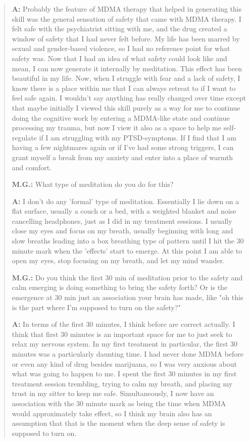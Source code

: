 \documentclass[12pt,letterpaper]{book}
\begin{document}
\begin{quotation}
    \textbf{A:} Probably the feature of MDMA therapy that helped in generating this skill was the general sensation of safety that came with MDMA therapy. I felt safe with the psychiatrist sitting with me, and the drug created a window of safety that I had never felt before. My life has been marred by sexual and gender-based violence, so I had no reference point for what safety was. Now that I had an idea of what safety could look like and mean, I can now generate it internally by meditation. This effect has been beautiful in my life. Now, when I struggle with fear and a lack of safety, I know there is a place within me that I can always retreat to if I want to feel safe again. I wouldn't say anything has really changed over time except that maybe initially I viewed this skill purely as a way for me to continue doing the cognitive work by entering a MDMA-like state and continue processing my trauma, but now I view it also as a space to help me self-regulate if I am struggling with my PTSD-symptoms. If I find that I am having a few nightmares again or if I've had some strong triggers, I can grant myself a break from my anxiety and enter into a place of warmth and comfort.

    \vspace{\baselineskip}

    \textbf{M.G.:} What type of meditation do you do for this?

    \textbf{A:} I don't do any 'formal' type of meditation. Essentially I lie down on a flat surface, usually a couch or a bed, with a weighted blanket and noise cancelling headphones, just as I did in my treatment sessions. I usually close my eyes and focus on my breath, usually beginning with long and slow breaths leading into a box breathing type of pattern until I hit the 30 minute mark when the 'effects' start to emerge. At this point I am able to open my eyes, stop focusing on my breath, and let my mind wander.

    \vspace{\baselineskip}

    \textbf{M.G.:} Do you think the first 30 min of meditation prior to the safety and calm emerging is doing something to bring the safety forth? Or is the emergence at 30 min just an association your brain has made, like "oh this is the part where I'm supposed to turn on the safety?"

    \textbf{A:} In terms of the first 30 minutes, I think before are correct actually. I think that first 30 minutes is an important space for me to just seek to relax my nervous system. In my first treatment in particular, the first 30 minutes was a particularly daunting time. I had never done MDMA before or even any kind of drug besides marijuana, so I was very anxious about what was going to happen to me. I spent the first 30 minutes in my first treatment session trembling, trying to calm my breath, and placing my trust in my sitter to keep me safe. Simultaneously, I now have an association with the 30 minute mark as being the time when MDMA would approximately take effect, so I think my brain also has an assumption that that is the moment when the deep sense of safety is supposed to turn on.


\end{quotation}
\end{document}
